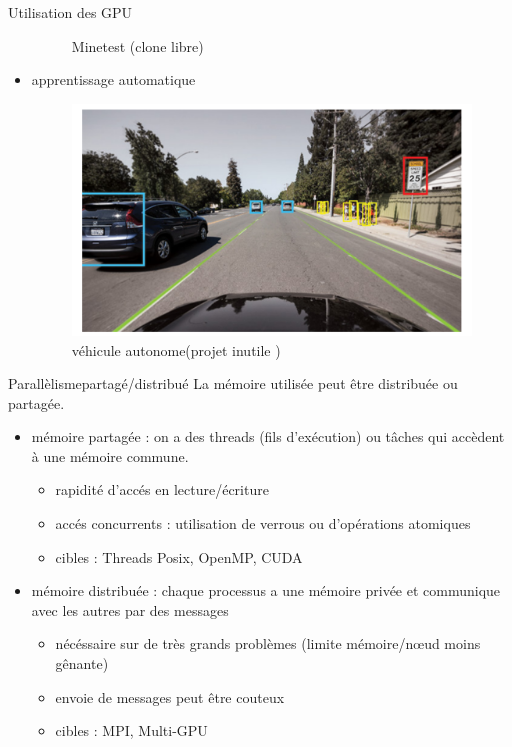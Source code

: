 \documentclass[11pt,mathserif]{beamer}
\newcommand{\argi}{\faLightbulbO}
\newcommand{\kontuz}{\faExclamationTriangle}
\newcommand{\pozik}{\faSmileO}
\newcommand{\triste}{\faFrownO}
\newcommand{\adibi}{\faCommentO}
\begin{document}
\begin{frame}{Utilisation des GPU}
\begin{itemize}[<+->]
\begin{minipage}[r]{0.49\linewidth}
\begin{figure}
          \caption{\tiny Minetest (clone libre) }
        \end{figure}
      \end{minipage}
    \item[\adibi]  \begin{minipage}[l]{0.49\linewidth}
     apprentissage automatique
      \end{minipage}
      \begin{minipage}[r]{0.49\linewidth}
        \begin{figure}
        \includegraphics[width=0.6\linewidth]{fig/neural.png}
          \caption{\tiny véhicule autonome(projet inutile \faMehO)}
        \end{figure}
      \end{minipage}
  \end{itemize}
\end{frame}

\begin{frame}{Parallèlisme}{partagé/distribué}
\pause
La mémoire utilisée peut être distribuée ou partagée.
  \begin{itemize}[<+->]
    \item mémoire partagée : on a des threads (fils d'exécution) ou tâches qui accèdent à une mémoire commune. 
      \begin{itemize}
        \item[\pozik] rapidité d'accés en lecture/écriture
        \item[\kontuz] accés concurrents : utilisation de verrous ou d'opérations atomiques
        \item[\argi] cibles : Threads Posix, OpenMP, CUDA
      \end{itemize}
    \item mémoire distribuée : chaque processus a une mémoire privée et communique avec les autres par des messages
      \begin{itemize}
        \item[\argi] nécéssaire sur de très grands problèmes (limite mémoire/nœud moins gênante)
        \item[\triste] envoie de messages peut être couteux
        \item[\argi] cibles : MPI, Multi-GPU
      \end{itemize}
  \end{itemize}
\end{frame}
\end{document}
